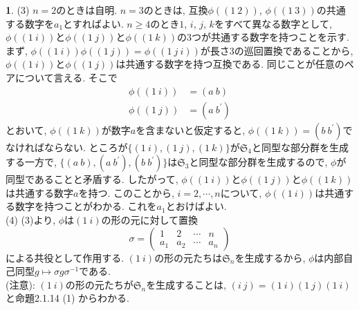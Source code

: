 \documentclass{article}
\theoremstyle{definition}
\newtheorem{ans}{}
\numberwithin{ans}{subsection}
\begin{document}
\begin{ans}
  (3) $n = 2$のときは自明.
  $n = 3$のときは, 互換$\phi((1\ 2))$, $\phi((1\ 3))$の共通する数字を$a_1$とすればよい.
  $n \ge 4$のとき$1$, $i$, $j$, $k$をすべて異なる数字として,
  $\phi((1\ i))$と$\phi((1\ j))$と$\phi((1\ k))$の$3$つが共通する数字を持つことを示す.
  まず, $\phi((1\ i))\phi((1\ j)) = \phi((1\ j\ i))$が長さ$3$の巡回置換であることから,
  $\phi((1\ i))$と$\phi((1\ j))$は共通する数字を持つ互換である.
  同じことが任意のペアについて言える.
  そこで
  \begin{align*}
    \phi((1\ i)) &= (a\ b) \\
    \phi((1\ j)) &= (a\ b^\prime)
  \end{align*}
  とおいて, $\phi((1\ k))$が数字$a$を含まないと仮定すると, $\phi((1\ k)) = (b\ b^\prime)$でなければならない.
  ところが$\{ (1\ i), (1\ j), (1\ k) \}$が$\mathfrak{S}_4$と同型な部分群を生成する一方で,
  $\{ (a\ b), (a\ b^\prime), (b\ b^\prime) \}$は$\mathfrak{S}_3$と同型な部分群を生成するので,
  $\phi$が同型であることと矛盾する.
  したがって, $\phi((1\ i))$と$\phi((1\ j))$と$\phi((1\ k))$は共通する数字$a$を持つ.
  このことから, $i = 2,\cdots, n$について, $\phi((1\ i))$は共通する数字を持つことがわかる.
  これを$a_1$とおけばよい.\\
  (4) (3)より, $\phi$は$(1\ i)$の形の元に対して置換
  \[
    \sigma = \begin{pmatrix}
      1 & 2 & \cdots & n \\
      a_1 & a_2 & \cdots & a_n
    \end{pmatrix}
  \]
  による共役として作用する. $(1\ i)$の形の元たちは$\mathfrak{S}_n$を生成するから,
  $\phi$は内部自己同型$g \mapsto \sigma g \sigma^{-1}$である.\\
  (注意): $(1\ i)$の形の元たちが$\mathfrak{S}_n$を生成することは,
  $(i\ j) = (1\ i)(1\ j)(1\ i)$と命題2.1.14 (1) からわかる.
\end{ans}
\end{document}
